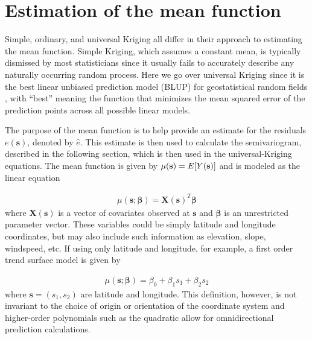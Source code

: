 \documentclass[12pt,twoside]{reedthesis}
\begin{document}
\section{Estimation of the mean function}

Simple, ordinary, and universal Kriging all differ in their approach to estimating the mean function. Simple Kriging, which assumes a constant mean, is typically dismissed by most statisticians since it usually fails to accurately describe any naturally occurring random process. Here we go over universal Kriging since it is the best linear unbiased prediction model (BLUP) for geostatistical random fields \cite{gelfand:2010}, with ``best'' meaning the function that minimizes the mean squared error of the prediction points across all possible linear models. 

The purpose of the mean function is to help provide an estimate for the residuals $e(\mathbf{s})$, denoted by $\hat e$. This estimate is then used to calculate the semivariogram, described in the following section, which is then used in the universal-Kriging equations. The mean function is given by $\mu(\mathbf{s}) = E[Y(\bold{s})]$ and is modeled as the linear equation

\begin{align*}
\mu(\mathbf{s}; \boldsymbol{\beta}) = \mathbf{X}(\mathbf{s})^T \boldsymbol{\beta}
\end{align*} 
where $\mathbf{X}(\mathbf{s})$ is a vector of covariates observed at $\mathbf{s}$ and $\mathbf{\beta}$ is an unrestricted parameter vector. These variables could be simply latitude and longitude coordinates, but may also include such information as elevation, slope, windspeed, etc. If using only latitude and longitude, for example, a first order  trend surface model is given by

\begin{align*}
\mu(\mathbf{s}; \boldsymbol{\beta}) = \beta_0 + \beta_1s_1 + \beta_2s_2
\end{align*} 
where $\mathbf{s} = (s_1, s_2)$ are latitude and longitude. This definition, however, is not invariant to the choice of origin or orientation of the coordinate system \cite{gelfand:2010} and higher-order polynomials such as the quadratic allow for omnidirectional prediction calculations.

\end{document}
